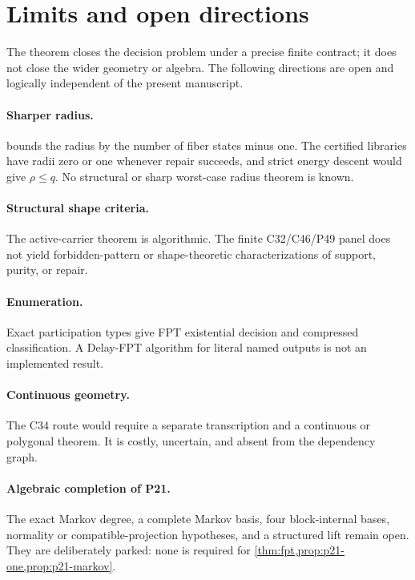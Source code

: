 \section{Limits and open directions}\label{sec:limits}

The theorem closes the decision problem under a precise finite contract; it
does not close the wider geometry or algebra.  The following directions are
open and logically independent of the present manuscript.

\paragraph{Sharper radius.}
 bounds the radius by the number of fiber states minus one.
The certified libraries have radii zero or one whenever repair succeeds, and
strict energy descent would give \(\rho\leq q\).  No structural or sharp
worst-case radius theorem is known.

\paragraph{Structural shape criteria.}
The active-carrier theorem is algorithmic.  The finite C32/C46/P49 panel does
not yield forbidden-pattern or shape-theoretic characterizations of support,
purity, or repair.

\paragraph{Enumeration.}
Exact participation types give FPT existential decision and compressed
classification.  A Delay-FPT algorithm for literal named outputs is not an
implemented result.

\paragraph{Continuous geometry.}
The C34 route would require a separate transcription and a continuous or
polygonal theorem.  It is costly, uncertain, and absent from the dependency
graph.

\paragraph{Algebraic completion of P21.}
The exact Markov degree, a complete Markov basis, four block-internal bases,
normality or compatible-projection hypotheses, and a structured lift remain
open.  They are deliberately parked: none is required for
\cref{thm:fpt,prop:p21-one,prop:p21-markov}.

